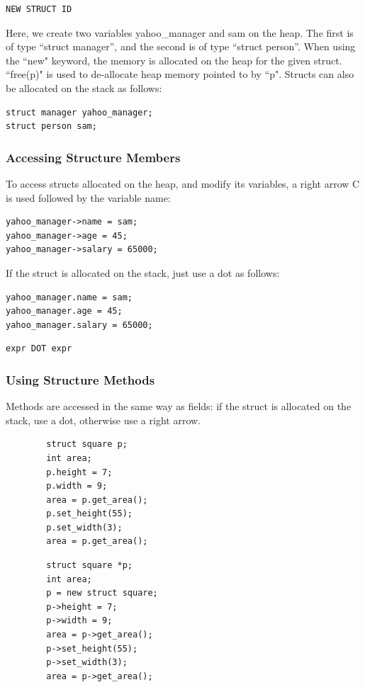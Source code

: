 \documentclass{article}
\begin{document}
\begin{Verbatim}[frame=single]
NEW STRUCT ID 
\end{Verbatim}
Here, we create two variables yahoo\_manager and sam on the heap. The first is of type ``struct manager'', and the second is of type ``struct person''. When using the ``new" keyword, the memory is allocated on the heap for the given struct. ``free(p)" is used to de-allocate heap memory pointed to by ``p". Structs can also be allocated on the stack as follows:

\begin{lstlisting}
struct manager yahoo_manager;
struct person sam;
\end{lstlisting}


\subsubsection{Accessing Structure Members}

 To access structs allocated on the heap, and modify its variables, a right arrow C is used followed by the variable name:
 \begin{lstlisting}
yahoo_manager->name = sam;
yahoo_manager->age = 45;
yahoo_manager->salary = 65000;
\end{lstlisting}

If the struct is allocated on the stack, just use a dot as follows:
 \begin{lstlisting}
yahoo_manager.name = sam;
yahoo_manager.age = 45;
yahoo_manager.salary = 65000;
\end{lstlisting}
 
 
\begin{Verbatim}[frame=single]
expr DOT expr 
\end{Verbatim}
\subsubsection{Using Structure Methods}
Methods are accessed in the same way as fields: if the struct is allocated on the stack, use a dot, otherwise use a right arrow.

 \begin{lstlisting}
        struct square p;
        int area;
        p.height = 7;
        p.width = 9;
        area = p.get_area();
        p.set_height(55);
        p.set_width(3);
        area = p.get_area();
\end{lstlisting}


 \begin{lstlisting}
        struct square *p;
        int area;
        p = new struct square;
        p->height = 7;
        p->width = 9;
        area = p->get_area();
        p->set_height(55);
        p->set_width(3);
        area = p->get_area();
\end{lstlisting}
\end{document}
